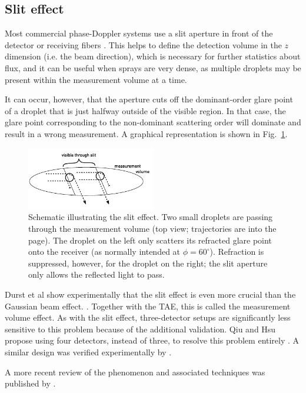 \documentclass[11.5pt]{book}
\newcommand*{\figref}[1]{Fig.~\ref{#1}}
\begin{document}
\subsection{Slit effect}
Most commercial phase-Doppler systems use a slit aperture in front of the
detector or receiving fibers \cite{Albrecht03}. This helps to define the
detection volume in the $z$ dimension (i.e. the beam direction), which is necessary for further statistics
about flux, and it can be useful when sprays are very dense, as multiple
droplets may be present within the measurement volume at a time.

It can occur, however, that the aperture cuts off the dominant-order glare point
of a droplet that is just halfway outside of the visible region. In that case,
the glare point corresponding to the non-dominant scattering order will
dominate and result in a wrong measurement. A graphical representation is shown
in \figref{fig:sliteffect}. 

\begin{figure}
    \centering
    \includegraphics[width=0.5\textwidth]{img/setup/sliteffect.pdf}
    \caption{Schematic illustrating the slit effect. Two small droplets are
    passing through the measurement volume (top view; trajectories are into the
page). The droplet on the left only scatters its refracted glare point onto the
receiver (as normally intended at $\phi=60^\circ$). Refraction is suppressed,
however, for the droplet on the right; the slit aperture only allows the
reflected light to pass. \label{fig:sliteffect}}
\end{figure}

Durst et al show experimentally that the slit effect is even more crucial than
the Gaussian beam effect. \cite{Durst94}. Together with the TAE, this
is called the measurement volume effect. As with the slit effect, three-detector
setups are significantly less sensitive to this problem because of the
additional validation. Qiu and Hsu propose using four detectors, instead of
three, to resolve this problem entirely \cite{Qiu99}. A similar design was
verified experimentally by \citet{Sipperley14}.

A more recent review of the phenomenon and associated techniques was published by
\citet{Strakey00, Strakey00a}.
\end{document}
